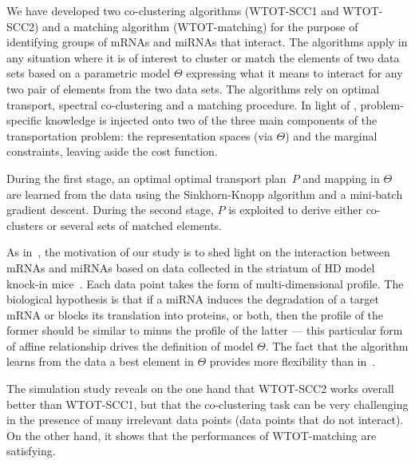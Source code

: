We have developed two co-clustering  algorithms (WTOT-SCC1 and WTOT-SCC2) and
a matching algorithm (WTOT-matching) for  the purpose of identifying groups of
mRNAs and miRNAs that interact. The algorithms apply in any situation where it
is of interest  to cluster or match the  elements of two data sets  based on a
parametric model  $\Theta$ expressing what  it means  to interact for  any two
pair  of elements  from the  two data  sets.  The  algorithms rely  on optimal
transport,  spectral  co-clustering and  a  matching  procedure. In  light  of
\citep[Section 1.3, page~25]{MAD2019},  problem-specific knowledge is injected
onto  two of  the three  main components  of the  transportation problem:  the
representation  spaces (via  $\Theta$) and  the marginal  constraints, leaving
aside the cost function.

During the first  stage, an optimal optimal transport plan~$P$  and mapping in
$\Theta$ are  learned from the data  using the Sinkhorn-Knopp algorithm  and a
mini-batch  gradient descent.  During the  second stage,  $P$ is  exploited to
derive either co-clusters or several sets of matched elements. 

As in~\cite{megret:inserm-02512089},  the motivation of  our study is  to shed
light on the  interaction between mRNAs and miRNAs based  on data collected in
the striatum of HD  model knock-in mice~\cite{Langfelder2016, Langfelder2018}.
Each data point takes the form of multi-dimensional profile.  The 
biological hypothesis is  that if a miRNA induces the  degradation of a target
mRNA or blocks its translation into proteins, or both, then the profile of the
former  should  be  similar to  minus  the  profile  of  the latter  ---  this
particular  form  of affine  relationship  drives  the  definition of  model $\Theta$.  The fact  that the
algorithm  learns from  the  data a  best element  in  $\Theta$ provides  more
flexibility than in~\cite{megret:inserm-02512089}.

The simulation  study reveals  on the  one hand  that WTOT-SCC2  works overall
better than WTOT-SCC1, but that the co-clustering task can be very challenging
in  the presence  of many  irrelevant  data points  (data points  that do  not
interact). On the other hand, it  shows that the performances of WTOT-matching
are satisfying.


